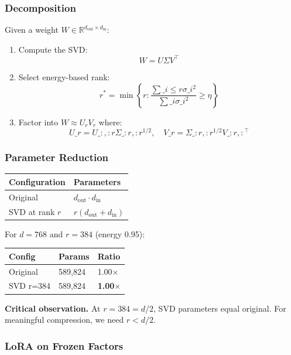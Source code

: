 \subsubsection{Decomposition}

Given a weight $W \in \mathbb{R}^{d_\text{out} \times d_\text{in}}$:

\begin{enumerate}
\item Compute the SVD:
  \[
W = U \Sigma V^\top
\]
\item Select energy-based rank:
  \[
r^* = \min \left\{ r : \frac{\sum\_{i \leq r} \sigma\_i^2}{\sum\_i \sigma\_i^2} \geq \eta \right\}
\]
\item Factor into $W \approx U_r V_r$ where:
  \[
U\_r = U\_{:, :r} \Sigma\_{:r, :r}^{1/2}, \quad
  V\_r = \Sigma\_{:r, :r}^{1/2} V\_{:r, :}^\top
\]

\end{enumerate}
\subsubsection{Parameter Reduction}

\begin{table}[H]
\centering
\small
\begin{tabular}{ll}
\toprule
\textbf{Configuration} & \textbf{Parameters} \\
\midrule
Original & $d_\text{out} \cdot d_\text{in}$ \\
SVD at rank $r$ & $r(d_\text{out} + d_\text{in})$ \\
\bottomrule
\end{tabular}
\end{table}

For $d = 768$ and $r = 384$ (energy 0.95):

\begin{table}[H]
\centering
\small
\begin{tabular}{lll}
\toprule
\textbf{Config} & \textbf{Params} & \textbf{Ratio} \\
\midrule
Original & 589,824 & 1.00$\times$ \\
SVD r=384 & 589,824 & \textbf{1.00$\times$} \\
\bottomrule
\end{tabular}
\end{table}

\textbf{Critical observation.} At $r = 384 = d/2$, SVD parameters equal original. 
For meaningful compression, we need $r < d/2$.

\subsubsection{LoRA on Frozen Factors}

